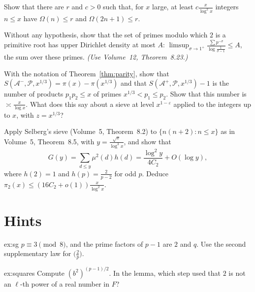 \begin{exercise}[$\star\star$]\label{ex:almostsg}
Show that there are $r$ and $c>0$ such that, for $x$ large, at least $c\frac x{\log^2x}$ integers $n\le x$ have $\Omega(n)\le r$ and $\Omega(2n+1)\le r$.
\end{exercise}

\begin{exercise}[$\star\star$]\label{ex:artinupper}
Without any hypothesis, show that the set of primes modulo which $2$ is a primitive root has upper Dirichlet density at most $A$: $\limsup_{\sigma\to1^+}\frac{\sum p^{-\sigma}}{\log\frac1{\sigma-1}}\le A$, the sum over these primes. \emph{(Use Volume~12, Theorem~8.23.)}
\end{exercise}

\begin{exercise}[$\star\star$]\label{ex:p2}
With the notation of Theorem~\ref{thm:parity}, show that $S(\mathcal A^-,\mathcal P,x^{1/3})=\pi(x)-\pi(x^{1/3})$ and that $S(\mathcal A^+,\mathcal P,x^{1/3})-1$ is the number of products $p_1p_2\le x$ of primes $x^{1/3}<p_1\le p_2$. Show that this number is $\asymp\frac x{\log x}$. What does this say about a sieve at level $x^{1-\varepsilon}$ applied to the integers up to $x$, with $z=x^{1/3}$?
\end{exercise}

\begin{exercise}[$\star\star\star$]\label{ex:twins16}
Apply Selberg's sieve (Volume~5, Theorem~8.2) to $\{n(n+2):n\le x\}$ as in Volume~5, Theorem~8.5, with $y=\frac{\sqrt x}{\log^3x}$, and show that
\[
G(y)=\sum_{d\le y}\mu^2(d)h(d)=\frac{\log^2y}{4C_2}+O(\log y),
\]
where $h(2)=1$ and $h(p)=\frac2{p-2}$ for odd $p$. Deduce $\pi_2(x)\le(16C_2+o(1))\frac x{\log^2x}$.
\end{exercise}

\section{Hints}

\begin{hint}{ex:sg}
$p\equiv3\pmod8$, and the prime factors of $p-1$ are $2$ and $q$. Use the second supplementary law for $\bigl(\frac2p\bigr)$.
\end{hint}

\begin{hint}{ex:squares}
Compute $(b^2)^{(p-1)/2}$. In the lemma, which step used that $2$ is not an $\ell$-th power of a real number in $F$?
\end{hint}

